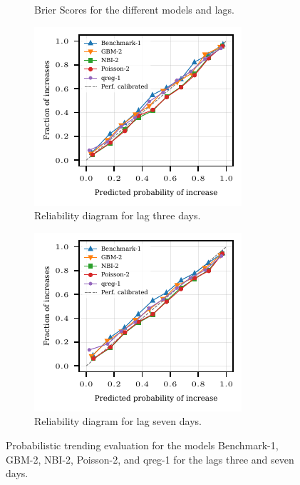 \begin{figure}
    \begin{subfigure}{0.32\textwidth}
    \tiny
    
    \caption{Brier Scores for the different models and lags.}\label{fig:app-eda-prob-brier}
    \end{subfigure}\hspace{0.01\textwidth}%
    \begin{subfigure}[t]{0.32\textwidth}
    \includegraphics{plots/ed_arrival/60_reliability_diagram_lag_3}
    \caption{Reliability diagram for lag three days.}\label{fig:app-eda-prob-rel-3}
    \end{subfigure}\hspace{0.01\textwidth}%
    \begin{subfigure}[t]{0.32\textwidth}
    \includegraphics{plots/ed_arrival/60_reliability_diagram_lag_7}
    \caption{Reliability diagram for lag seven days.}\label{fig:app-eda-prob-rel-7}
    \end{subfigure}
    \caption{Probabilistic trending evaluation for the models Benchmark-1, GBM-2, NBI-2, Poisson-2, and qreg-1 for the lags three and seven days.}
    \label{fig:app-eda-prob}
\end{figure}

